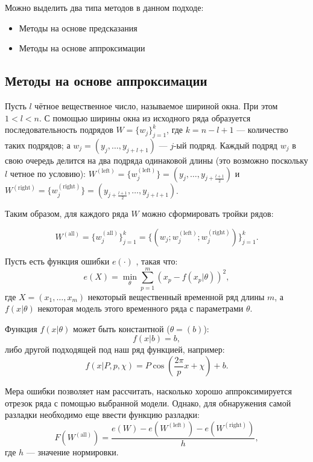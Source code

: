 \documentclass[%
12pt,
master,  %
natbib,      %
subf,        %
substylefile = spbu.rtx,
href,        %
colorlinks,  %
]{disser}
\begin{document}
Можно выделить два типа методов в данном подходе:
\begin{itemize}
	\item Методы на основе предсказания
	\item Методы на основе аппроксимации
\end{itemize}

\subsection{Методы на основе аппроксимации}

Пусть $l$ чётное вещественное число, называемое шириной окна. При этом  $ 1 < l < n $. С помощью ширины окна из исходного ряда образуется последовательность подрядов $W = \{ w_j \}_{j=1}^k$, где $k = n - l + 1$ --- количество таких подрядов; а $ w_j = (y_j, \dots, y_{j+l+1}) $ --- $j$-ый подряд. Каждый подряд  $w_j$  в свою очередь делится на два подряда одинаковой длины (это возможно поскольку $l$ четное по условию): $ W^{\mathrm{(left)}} = \{w_j^{\mathrm{(left)}} \}  =  (y_j, \dots, y_{j+\frac{l+1}{2}})$ и $W^{\mathrm{(right)}} = \{w_j^{\mathrm{(right)}} \} = (y_{j+\frac{l+1}{2}}, \dots, y_{j+l+1})$.

Таким образом, для каждого ряда $W$ можно сформировать тройки рядов: 

\begin{equation*}
W^{\mathrm{(all)}} = \{w_j^{\mathrm{(all)}} \}_{j=1}^k =  \{(w_j; w_j^{\mathrm{(left)}}; w_j^{\mathrm{(right)}}) \}_{j=1}^k. 
\end{equation*}

Пусть есть функция ошибки $e(\cdot)$ , такая что:
\begin{equation*}
e(X) = \min_{\theta}{\sum_{p=1}^m(x_p - f(x_p | \theta))^2 },
\end{equation*}
где $X = (x_1, \dots, x_m)$ некоторый вещественный временной ряд длины $m$, а $f(x | \theta)$ некоторая модель этого временного ряда с параметрами $\theta$.

Функция $f(x|\theta)$ может быть константной ($\theta = (b)$):
\begin{equation*}
f(x | b) = b,
\end{equation*}
либо другой подходящей под наш ряд функцией, например:
\begin{equation*}
f(x | P, p, \chi) = P\cos(\frac{2\pi}{p}x + \chi) + b. 
\end{equation*}

Мера ошибки позволяет нам рассчитать, насколько хорошо аппроксимируется отрезок ряда с помощью выбранной модели. Однако, для обнаружения самой разладки необходимо еще ввести функцию разладки:
\begin{equation*}
F(W^{\mathrm{(all)}}) = \frac{e(W) - e(W^{\mathrm{(left)}}) - e(W^{\mathrm{(right)}})}{h}, 
\end{equation*}
где $h$ --- значение нормировки.
\end{document}

